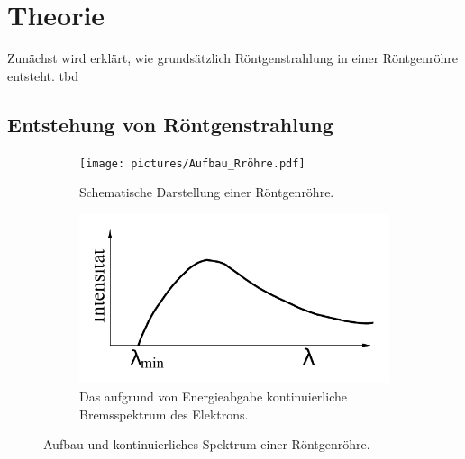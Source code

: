 \section{Theorie}
\label{sec:Theorie}

Zunächst wird erklärt, wie grundsätzlich Röntgenstrahlung in einer Röntgenröhre entsteht.
tbd

\subsection{Entstehung von Röntgenstrahlung} \label{sec:Röntgenstrahlung}

\begin{figure}
    \begin{subfigure}{0.48\textwidth}
        \centering
        \texttt{[image: pictures/Aufbau\_Rröhre.pdf]}
        \caption{Schematische Darstellung einer Röntgenröhre. \cite{demtroeder2}}
        \label{fig:aufbau}
    \end{subfigure}
    \begin{subfigure}{0.48\textwidth}
        \centering
        \includegraphics[width=\textwidth]{pictures/bremsspektrum.pdf}
        \caption{Das aufgrund von Energieabgabe kontinuierliche Bremsspektrum des Elektrons. \cite{v602}}
        \label{fig:bremsspektrum}
    \end{subfigure}
    \caption{Aufbau und kontinuierliches Spektrum einer Röntgenröhre.}
\end{figure}

